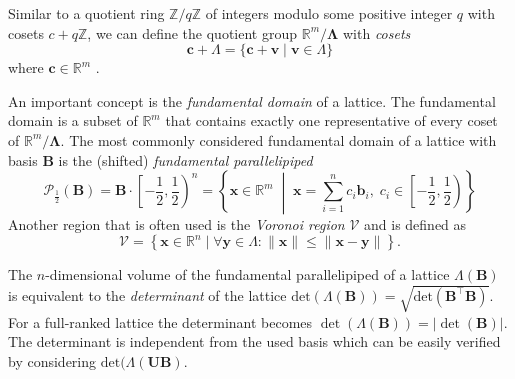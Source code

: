 
Similar to a quotient ring $\mathbb{Z}/q\mathbb{Z}$ of integers modulo some positive integer $q$ with cosets $c + q\mathbb{Z}$, we can define the quotient group $\mathbb{R}^m/\mathbf{\Lambda}$ with \textit{cosets}
\begin{equation}
    \mathbf{c} + \Lambda = \{\mathbf{c} + \mathbf{v} \mid \mathbf{v}\in \Lambda\}
\end{equation}
where $\mathbf{c} \in \mathbb{R}^m$ \cite{Pei16}. %

An important concept is the \textit{fundamental domain} of a lattice. The fundamental domain is a subset of $\mathbb{R}^m$ that contains exactly one representative of every coset of $\mathbb{R}^m/\mathbf{\Lambda}$. The most commonly considered fundamental domain of a lattice with basis $\mathbf{B}$ is the (shifted) \textit{fundamental parallelipiped}
\begin{equation} \label{eq:fundamental-parallelipiped}
    \mathcal{P}_{\frac{1}{2}}(\mathbf{B}) = \mathbf{B} \cdot \left[ - \frac{1}{2}, \frac{1}{2}\right)^n = \left\{ \mathbf{x} \in \mathbb{R}^m \;\middle|\; \mathbf{x} = \sum_{i=1}^n c_i \mathbf{b}_i, \; c_i \in  \left[ - \frac{1}{2}, \frac{1}{2}\right) \right\}
\end{equation}
Another region that is often used is the \textit{Voronoi region} $\mathcal{V}$ \cite{GJS15} and is defined as
\begin{equation}\label{eq:voronoi-region}
    \mathcal{V} = \left\{ \mathbf{x} \in \mathbb{R}^n \mid \forall \mathbf{y} \in \Lambda : \| \mathbf{x} \| \leq \| \mathbf{x} - \mathbf{y} \| \right\}.
\end{equation}

The $n$-dimensional volume of the fundamental parallelipiped of a lattice $\Lambda(\mathbf{B})$ is equivalent to the \textit{determinant} of the lattice $\text{det}(\Lambda(\mathbf{B})) = \sqrt{\text{det}\left(\mathbf{B}^\intercal \mathbf{B}\right)}$. For a full-ranked lattice the determinant becomes $\det(\Lambda(\mathbf{B})) = |\det(\mathbf{B})|$. The determinant is independent from the used basis which can be easily verified by considering  $\text{det}(\Lambda(\mathbf{U}\mathbf{B})$.

